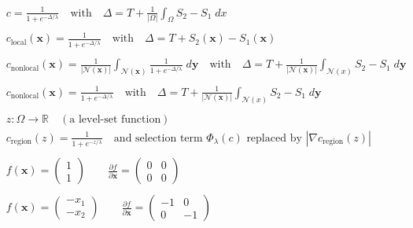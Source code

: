 \documentclass[11pt]{article}
\newcommand{\lam}{\lambda}
\newcommand{\mat}[1]{\begin{pmatrix} #1 \end{pmatrix}}
\newcommand{\der}{\partial}
\newcommand{\deriv}[2]{\frac{\der #1}{\der #2}}
\newcommand{\x}{\boldsymbol{x}}
\newcommand{\y}{\boldsymbol{y}}
\begin{document}
\begin{align*}
&c = \frac{1}{1+e^{-\Delta/\lambda}} \quad\text{with}\quad\Delta=T+\frac{1}{|\Omega|}\int_\Omega S_2 - S_1 \; dx
\\\\
&c_{\text{local}}(\x) = \frac{1}{1+e^{-\Delta/\lambda}} \quad\text{with}\quad\Delta=T+S_2(\x) - S_1(\x)
\\\\
&c_{\text{nonlocal}}(\x) = \frac{1}{|\mathcal{N(\x)}|} \int_{\mathcal{N(\x)}}\frac{1}{1+e^{-\Delta/\lam}}\;d\y \quad\text{with}\quad \Delta = T + \frac{1}{|\mathcal{N}(\x)|}\int_{\mathcal{N}(x)} S_2-S_1\;d\y
\\\\
&c_{\text{nonlocal}}(\x) = \frac{1}{1+e^{-\Delta/\lambda}} \quad\text{with}\quad \Delta = T + \frac{1}{|\mathcal{N}(\x)|}\int_{\mathcal{N}(x)} S_2-S_1\;d\y
\\\\
&z : \Omega \rightarrow \mathbb{R} \quad (\text{a level-set function}) 
\\
&c_{\text{region}}(z) = \frac{1}{1+e^{-z/\lambda}} \quad\text{and selection term~}\Phi_\lam(c)\text{~replaced by~} |\nabla c_{\text{region}}(z)|
\\\\
&f(\x) = \mat{1\\1} \quad\quad \deriv{f}{\x} = \mat{0&0\\0&0}
\\\\
&f(\x) = \mat{-x_1 \\ -x_2} \quad\quad \deriv{f}{\x} = \mat{-1&0\\0&-1}
\end{align*}
\end{document}
